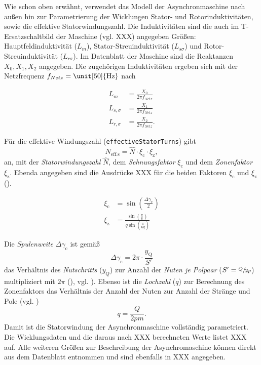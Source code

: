Wie schon oben erwähnt, verwendet das Modell der Asynchronmaschine nach
außen hin zur Parametrierung der Wicklungen Stator- und
Rotorinduktivitäten, sowie die effektive Statorwindungszahl. Die
Induktivitäten sind die auch im T-Ersatzschaltbild der Maschine (vgl.
XXX) angegeben Größen: Hauptfeldinduktivität (\(L_m\)),
Stator-Streuinduktivität (\(L_{s\sigma}\)) und Rotor-Streuinduktivität
(\(L_{r\sigma}\)). Im Datenblatt der Maschine sind die Reaktanzen
\(X_0, X_1, X_2\) angegeben. Die zugehörigen Induktivitäten ergeben sich
mit der Netzfrequenz \(f_{Netz}=\unit[50]{\mathrm{Hz}}\) nach

\begin{align}
L_m &= \frac{X_0}{2\pi f_{Netz}} \\
L_{s,\sigma} &= \frac{X_1}{2\pi f_{Netz}} \\
L_{r,\sigma} &= \frac{X_2}{2\pi f_{Netz}}.
\end{align}

Für die effektive Windungszahl (\texttt{effectiveStatorTurns}) gibt
\cite[S. 217]{kralModelicaObjektorientierteModellbildung2019} \[
N_{\mathrm{eff. s}} = \hat{N}\cdot\xi_{\mathrm{c}}\cdot\xi_{\mathrm{z}},
\] an, mit der \emph{Statorwindungszahl} \(\hat{N}\), dem
\emph{Sehnungsfaktor} \(\xi _{\mathrm{c}}\) und dem \emph{Zonenfaktor}
\(\xi _{\mathrm{z}}\). Ebenda angegeben sind die Ausdrücke XXX für die
beiden Faktoren \(\xi _{\mathrm{c}}\) und \(\xi_{\mathrm{z}}\)
(\cite[S. 165, S. 217]{kralModelicaObjektorientierteModellbildung2019}).

\begin{align}
\xi _{\mathrm{c}} &= \sin(\frac{\Delta\gamma _{\mathrm{c}}}{2}) \\
\xi _{\mathrm{z}} &= \frac{\sin(\frac{\pi}{6})}{q\sin(\frac{\pi}{6q})}
\end{align}

Die \emph{Spulenweite} \(\Delta\gamma _{\mathrm{c}}\) ist gemäß \[
\Delta\gamma _{\mathrm{c}} = 2\pi\cdot\frac{y _{\mathrm{Q}}}{S'}
\]das Verhältnis des \emph{Nutschritts} (\(y_Q\)) zur Anzahl der
\emph{Nuten je Polpaar} (\(S'=\sfrac{Q}{2p}\)) multipliziert mit
\(2\pi\)
(\cite[S. 168, S. 161]{kralModelicaObjektorientierteModellbildung2019}),
vgl. \cite[S. 76, S. 119]{binderElektrischeMaschinenUnd2012}). Ebenso
ist die \emph{Lochzahl} (\(q\)) zur Berechnung des Zonenfaktors das
Verhältnis der Anzahl der Nuten zur Anzahl der Stränge und Pole (vgl.
\cite[S. 151]{kralModelicaObjektorientierteModellbildung2019})\[
q = \frac{Q}{2pm}.
\] Damit ist die Statorwindung der Asynchronmaschine vollständig
parametriert. Die Wicklungsdaten und die daraus nach XXX berechneten
Werte listet XXX auf. Alle weiteren Größen zur Beschreibung der
Asynchromaschine können direkt aus dem Datenblatt entnommen und sind
ebenfalls in XXX angegeben.

